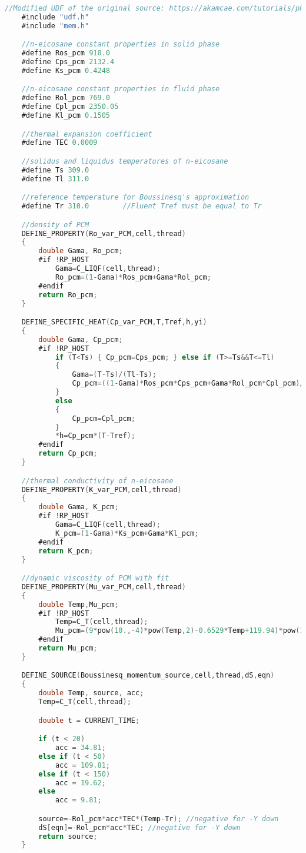 \newpage

\begin{lstlisting}[language=C, caption={Vollständige \ac{pcm} \ac{udf} eicosane.c}, label={lst:udf_rest}]
    //Modified UDF of the original source: https://akamcae.com/tutorials/phase-change-material-simulation-in-ansys-fluent/
    #include "udf.h"
    #include "mem.h"

    //n-eicosane constant properties in solid phase
    #define Ros_pcm 910.0
    #define Cps_pcm 2132.4
    #define Ks_pcm 0.4248

    //n-eicosane constant properties in fluid phase
    #define Rol_pcm 769.0
    #define Cpl_pcm 2350.05
    #define Kl_pcm 0.1505

    //thermal expansion coefficient
    #define TEC 0.0009

    //solidus and liquidus temperatures of n-eicosane
    #define Ts 309.0
    #define Tl 311.0

    //reference temperature for Boussinesq's approximation
    #define Tr 310.0		//Fluent Tref must be equal to Tr

    //density of PCM
    DEFINE_PROPERTY(Ro_var_PCM,cell,thread)
    {
        double Gama, Ro_pcm;
        #if !RP_HOST
            Gama=C_LIQF(cell,thread);
            Ro_pcm=(1-Gama)*Ros_pcm+Gama*Rol_pcm;
        #endif
        return Ro_pcm;
    }

    DEFINE_SPECIFIC_HEAT(Cp_var_PCM,T,Tref,h,yi)
    {
        double Gama, Cp_pcm;
        #if !RP_HOST
            if (T<Ts) { Cp_pcm=Cps_pcm; } else if (T>=Ts&&T<=Tl)
            {
                Gama=(T-Ts)/(Tl-Ts);
                Cp_pcm=((1-Gama)*Ros_pcm*Cps_pcm+Gama*Rol_pcm*Cpl_pcm)/((1-Gama)*Ros_pcm+Gama*Rol_pcm);
            }
            else
            {
                Cp_pcm=Cpl_pcm;
            }
            *h=Cp_pcm*(T-Tref);
        #endif
        return Cp_pcm;
    }

    //thermal conductivity of n-eicosane
    DEFINE_PROPERTY(K_var_PCM,cell,thread)
    {
        double Gama, K_pcm;
        #if !RP_HOST
            Gama=C_LIQF(cell,thread);
            K_pcm=(1-Gama)*Ks_pcm+Gama*Kl_pcm;
        #endif
        return K_pcm;
    }

    //dynamic viscosity of PCM with fit
    DEFINE_PROPERTY(Mu_var_PCM,cell,thread)
    {
        double Temp,Mu_pcm;
        #if !RP_HOST
            Temp=C_T(cell,thread);
            Mu_pcm=(9*pow(10.,-4)*pow(Temp,2)-0.6529*Temp+119.94)*pow(10.,-3);
        #endif
        return Mu_pcm;
    }

    DEFINE_SOURCE(Boussinesq_momentum_source,cell,thread,dS,eqn)
    {
        double Temp, source, acc;
        Temp=C_T(cell,thread);

        double t = CURRENT_TIME;

        if (t < 20)
            acc = 34.81;
        else if (t < 50)
            acc = 109.81;
        else if (t < 150)
            acc = 19.62;
        else
            acc = 9.81;

        source=-Rol_pcm*acc*TEC*(Temp-Tr); //negative for -Y down
        dS[eqn]=-Rol_pcm*acc*TEC; //negative for -Y down
        return source;
    }
\end{lstlisting}

